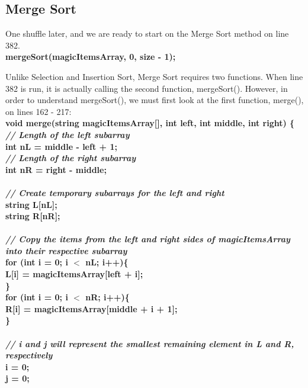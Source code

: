 \documentclass{article}
\begin{document}
\pagebreak
\subsection{Merge Sort}
One shuffle later, and we are ready to start on the Merge Sort method on line 382. \\

\textbf{\indent mergeSort(magicItemsArray, 0, size - 1);\\ }

Unlike Selection and Insertion Sort, Merge Sort requires two functions. When line 382 is run, it is actually calling the second function, mergeSort(). However, in order to understand mergeSort(), we must first look at the first function, merge(), on lines 162 - 217: \\

\textbf{
void merge(string magicItemsArray[], int left, int middle, int right) \{\\
    \textit{ \indent // Length of the left subarray\\ }
    \indent int nL = middle - left + 1;\\
    \textit{\indent // Length of the right subarray\\}
    \indent int nR = right - middle;\\
\\
    \textit{\indent // Create temporary subarrays for the left and right\\}
    \indent string L[nL];\\
    \indent string R[nR];\\
\\
    \textit{\indent // Copy the items from the left and right sides of magicItemsArray into their respective subarray\\}
    \indent for (int i = 0; i $<$ nL; i++)\{\\
        \indent \indent L[i] = magicItemsArray[left + i];\\
    \indent \}\\
    \indent for (int i = 0; i $<$ nR; i++)\{\\
        \indent \indent R[i] = magicItemsArray[middle + i + 1];\\
    \indent \}\\
\\
    \textit{\indent // i and j will represent the smallest remaining element in L and R, respectively\\}
    \indent i = 0;\\
    \indent j = 0;\\
}
\end{document}
